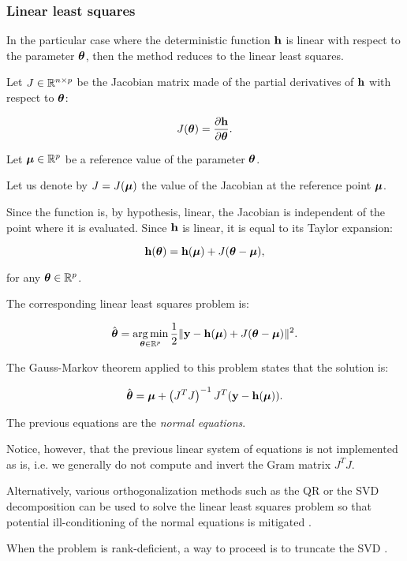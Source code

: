 \documentclass{beamer}
\begin{document}
\begin{frame}
\frametitle{Linear least squares}

In the particular case where the deterministic function ${\bf h}$
is linear with respect to the parameter $\boldsymbol{\theta}$, then the
method reduces to the linear least squares. 

Let $J \in \mathbb{R}^{n \times p}$ be the Jacobian matrix made of the
partial derivatives of ${\bf h}$ with respect to
$\boldsymbol{\theta}$:

$$
J(\boldsymbol{\theta}) = \frac{\partial {\bf h}}{\partial \boldsymbol{\theta}}.
$$

\end{frame}


\begin{frame}
Let $\boldsymbol{\mu} \in \mathbb{R}^p$ be a reference value of the
parameter $\boldsymbol{\theta}$. 

Let us denote by $J=J(\boldsymbol{\mu})$ the value of the Jacobian at the reference point
$\boldsymbol{\mu}$. 

Since the function is, by hypothesis, linear, the
Jacobian is independent of the point where it is evaluated. Since
${\bf h}$ is linear, it is equal to its Taylor expansion:

$$
       {\bf h}(\boldsymbol{\theta}) = {\bf h}(\boldsymbol{\mu}) + J (\boldsymbol{\theta} - \boldsymbol{\mu}),
$$

for any $\boldsymbol{\theta} \in \mathbb{R}^p$.

\end{frame}


\begin{frame}
The corresponding linear least squares problem is:

$$
       \hat{\boldsymbol{\theta}} = \operatorname*{arg\,min}_{\boldsymbol{\theta} \in \mathbb{R}^p} \frac{1}{2} \|{\bf y} - {\bf h}(\boldsymbol{\mu}) + J (\boldsymbol{\theta} - \boldsymbol{\mu})\|^2.
$$

The Gauss-Markov theorem applied to this problem states that the
solution is:

$$
       \hat{\boldsymbol{\theta}} = \boldsymbol{\mu} + \left(J^T J\right)^{-1} J^T ( {\bf y} - {\bf h}(\boldsymbol{\mu})).
$$

\end{frame}


\begin{frame}
The previous equations are the \emph{normal equations}. 

Notice, however, that the previous linear system of equations 
is not implemented as is, i.e.
we generally do not compute and invert the Gram matrix $J^T J$.

Alternatively, various orthogonalization methods such as the QR or the
SVD decomposition can be used to solve the linear least squares problem
so that potential ill-conditioning of the normal equations is
mitigated \cite{Bjorck1996}.

When the problem is rank-deficient, a way to proceed is to truncate 
the SVD \cite{Hansen00thelcurve}. 
\end{frame}
\end{document}
